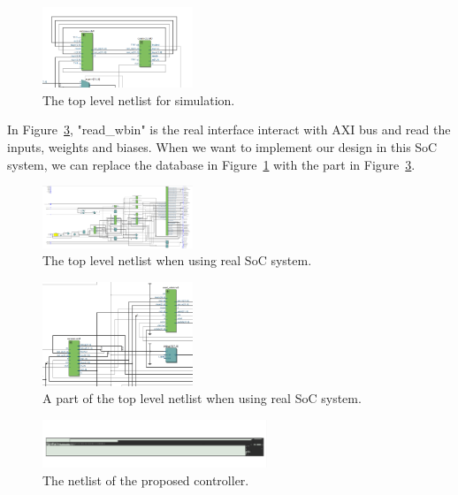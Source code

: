 \documentclass[conference]{IEEEtran}
\begin{document}
\begin{figure}[!hbt]
	\centering
	\includegraphics[width=0.4\textwidth]{topnl.png}
	\caption{The top level netlist for simulation.}
	\label{fig:topnl}
\end{figure}

In Figure~\ref{fig:topnl2p}, "read\_wbin" is the real interface interact with AXI bus and read the inputs, weights and biases. When we want to implement our design in this SoC system, we can replace the database in Figure~\ref{fig:topnl} with the part in Figure~\ref{fig:topnl2p}.

\begin{figure}[!hbt]
	\centering
	\includegraphics[width=0.4\textwidth]{topnl2.png}
	\caption{The top level netlist when using real SoC system.}
	\label{fig:topnl2}
\end{figure}

\begin{figure}[!hbt]
	\centering
	\includegraphics[width=0.4\textwidth]{topnl2p.png}
	\caption{A part of the top level netlist when using real SoC system.}
	\label{fig:topnl2p}
\end{figure}

\begin{figure}[!hbt]
	\centering
	\includegraphics[width=0.6\textwidth]{ctrlnl.png}
	\caption{The netlist of the proposed controller.}
	\label{fig:ctrlnl}
\end{figure}
\end{document}
